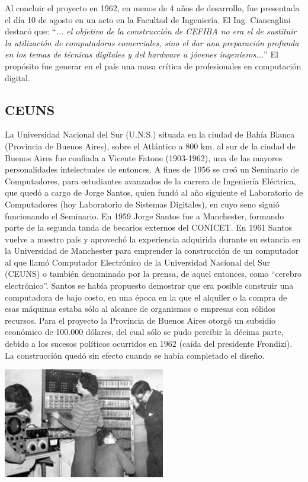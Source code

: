 \documentclass[%
 	final,
%
	notitlepage,
	narroweqnarray,
	inline,
 	twoside,
	]{ieee}
\begin{document}
Al concluir el proyecto en 1962, en menos de 4 a\~nos de desarrollo, fue presentada el d\'ia 10 de agosto en un acto en la Facultad de Ingenier\'ia. El Ing. Ciancaglini destac\'o que: ``\textit{... el objetivo de la construcci\'on de CEFIBA no era el de sustituir la utilizaci\'on de computadoras comerciales, sino el dar una preparaci\'on profunda en los temas de t\'ecnicas digitales y del hardware a j\'ovenes ingenieros...}'' El prop\'osito fue generar en el pa\'is una masa cr\'itica de profesionales en computaci\'on digital.

\subsection*{CEUNS}

La Universidad Nacional del Sur (U.N.S.) situada en la ciudad de Bah\'ia Blanca (Provincia de Buenos Aires), sobre el Atl\'antico a 800 km. al sur de la ciudad de Buenos Aires fue confiada a Vicente Fatone (1903-1962), una de las mayores personalidades intelectuales de entonces. A fines de 1956 se cre\'o un Seminario de Computadores, para estudiantes avanzados de la carrera de Ingenier\'ia El\'ectrica, que qued\'o a cargo de Jorge Santos, quien fund\'o al a\~no siguiente el Laboratorio de Computadores (hoy Laboratorio de Sistemas Digitales), en cuyo seno sigui\'o funcionando el Seminario.
En 1959 Jorge Santos fue a Manchester, formando parte de la segunda tanda de becarios externos del CONICET. En 1961 Santos vuelve a nuestro pa\'is y aprovech\'o la experiencia adquirida durante su estancia en la Universidad de Manchester para emprender la construcci\'on de un computador al que llam\'o Computador Electr\'onico de la Universidad Nacional del Sur (CEUNS) o tambi\'en denominado por la prensa, de aquel entonces, como ``cerebro electr\'onico''. Santos se hab\'ia propuesto demostrar que era posible construir una computadora de bajo costo, en una \'epoca en la que el alquiler o la compra de esas m\'aquinas estaba s\'olo al alcance de organismos o empresas con s\'olidos recursos. Para el proyecto la Provincia de Buenos Aires otorg\'o un subsidio econ\'omico de 100.000 d\'olares, del cual s\'olo se pudo percibir la d\'ecima parte, debido a los sucesos pol\'iticos ocurridos en 1962 (ca\'ida del presidente Frondizi). La construcci\'on qued\'o sin efecto cuando se hab\'ia completado el dise\~no.

\begin{center}\includegraphics[width=200pt, height=136pt]{ceuns.png}\end{center}
\end{document}
